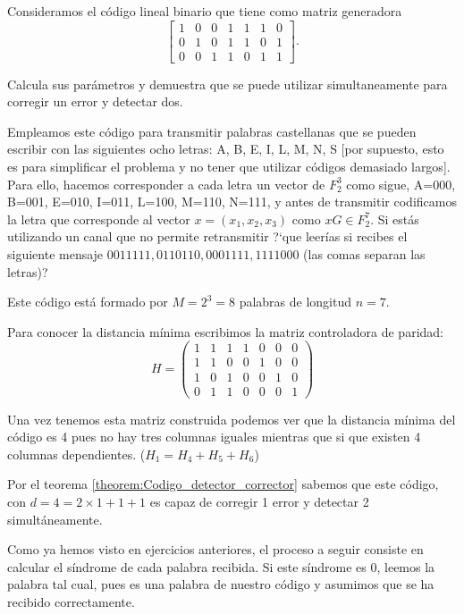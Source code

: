 \begin{problem}[4]
Consideramos el código lineal binario que tiene como matriz
generadora $$\left[\begin{array}{ccccccc}
1&0&0&1&1&1&0\\0&1&0&1&1&0&1\\0&0&1&1&0&1&1\end{array}\right].$$

\ppart Calcula sus parámetros y demuestra que se puede utilizar
simultaneamente para corregir un error y detectar dos.

\ppart Empleamos este código para transmitir palabras castellanas que
se pueden escribir con las siguientes ocho letras: A, B, E, I, L,
M, N, S [por supuesto, esto es para simplificar el problema y no
tener que utilizar códigos demasiado largos]. Para ello, hacemos
corresponder a cada letra un vector de $ F_2^3$ como sigue, A=000,
B=001, E=010, I=011, L=100, M=110, N=111, y antes de transmitir
codificamos la letra que corresponde al vector $x=(x_1,x_2,x_3)$
como $xG\in F_2^7$. Si estás utilizando un canal que no permite
retransmitir ?`que leerías si recibes el siguiente mensaje
$0011111,0110110,0001111,1111000$ (las comas separan las letras)?

\solution


\spart

Este código está formado por $M=2^3=8$ palabras de longitud $n=7$.

Para conocer la distancia mínima escribimos la matriz controladora de paridad:
\[H = \left(\begin{array}{ccccccc}
1 & 1 & 1 & 1 & 0 & 0 & 0 \\
1 & 1 & 0 & 0 & 1 & 0 & 0 \\
1 & 0 & 1 & 0 & 0 & 1 & 0 \\
0 & 1 & 1 & 0 & 0 & 0 & 1
\end{array} \right)\]

Una vez tenemos esta matriz construida podemos ver que la distancia mínima del código es 4 pues no hay tres columnas iguales mientras que si que existen 4 columnas dependientes. ($H_1=H_4+H_5+H_6$)

Por el teorema \ref{theorem:Codigo_detector_corrector} sabemos que este código, con $d=4=2\times 1 + 1 + 1$ es capaz de corregir 1 error y detectar 2 simultáneamente.

\spart

Como ya hemos visto en ejercicios anteriores, el proceso a seguir consiste en calcular el síndrome de cada palabra recibida. Si este síndrome es 0, leemos la palabra tal cual, pues es una palabra de nuestro código y asumimos que se ha recibido correctamente.


\end{problem}
